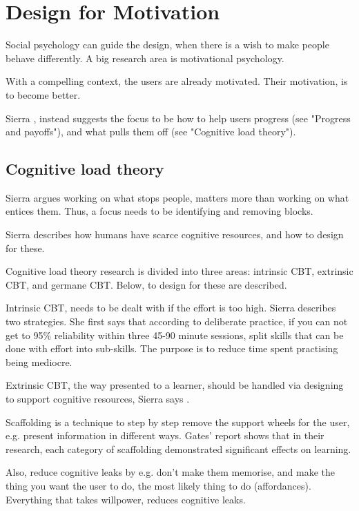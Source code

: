 \section{Design for Motivation}

Social psychology can guide the design, when there is a wish to make people behave differently. A big research area is motivational psychology.

With a compelling context, the users are already motivated. Their motivation, is to become better.

Sierra \cite{sierra}, instead suggests the focus to be how to help users progress (see "Progress and payoffs"), and what pulls them off (see "Cognitive load theory").

\subsection{Cognitive load theory}

Sierra argues working on what stops people, matters more than working on what entices them. Thus, a focus needs to be identifying and removing blocks.

Sierra \cite{sierra} describes how humans have scarce cognitive resources, and how to design for these.

Cognitive load theory research is divided into three areas: intrinsic CBT, extrinsic CBT, and germane CBT. Below, to design for these are described.

Intrinsic CBT, needs to be dealt with if the effort is too high. Sierra \cite{sierra}describes two strategies. She first says that according to deliberate practice, if you can not get to 95\% reliability within three 45-90 minute sessions, split skills that can be done with effort into sub-skills. The purpose is to reduce time spent practising being mediocre.

Extrinsic CBT, the way presented to a learner, should be handled via designing to support cognitive resources, Sierra says \cite{sierra}.

Scaffolding is a technique to step by step remove the support wheels for the user, e.g. present information in different ways. Gates' \cite{gates} report shows that in their research, each category of scaffolding demonstrated significant effects on learning.

Also, reduce cognitive leaks by e.g. don't make them memorise, and make the thing you want the user to do, the most likely thing to do (affordances). Everything that takes willpower, reduces cognitive leaks.

